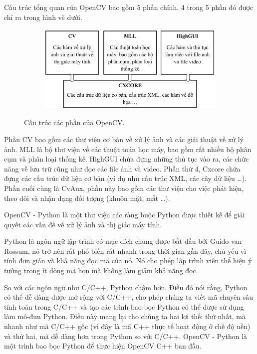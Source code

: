 Cấu trúc tổng quan của OpenCV bao gồm 5 phần chính. 4 trong 5 phần đó được chỉ ra
trong hình vẽ dưới.

\begin{figure}[t]
    \begin{subfigure}{0.7\textwidth}
        \includegraphics[width=0.99\linewidth]{Chapters/items/chap2_1.jpg}
        \caption{}
        \label{fig:chap2_1}
    \end{subfigure}
    \caption{Cấu trúc các phần của OpenCV.}
\end{figure}

Phần CV bao gồm các thư viện cơ bản về xử lý ảnh và các giải thuật về xử lý ảnh.
MLL là bộ thư viện về các thuật toán học máy, bao gồm rất nhiều bộ phân cụm và phân
loại thống kê. HighGUI chứa đựng những thủ tục vào ra, các chức năng về lưu trữ cũng
như đọc các file ảnh và video. Phần thứ 4, Cxcore chứa đựng các cấu trúc dữ liệu
cơ bản (ví dụ như cấu trúc XML, các cây dữ liệu …). Phần cuối cùng là CvAux, phần này
bao gồm các thư viện cho việc phát hiện, theo dõi và nhận dạng đối tượng (khuôn mặt, mắt …).

OpenCV - Python là một thư viện các ràng buộc Python được thiết kế để giải quyết các vấn đề
về xử lý ảnh và thị giác máy tính.

Python là ngôn ngữ lập trình có mục đích chung được bắt đầu bởi Guido van Rossum,
nó trở nên rất phổ biến rất nhanh trong thời gian gần đây, chủ yếu vì tính đơn giản
và khả năng đọc mã của nó. Nó cho phép lập trình viên thể hiện ý tưởng trong ít dòng
mã hơn mà không làm giảm khả năng đọc.

So với các ngôn ngữ như C/C++, Python chậm hơn. Điều đó nói rằng, Python có thể dễ dàng
được mở rộng với C/C++, cho phép chúng ta viết mã chuyên sâu tính toán trong C/C++
và tạo các trình bao bọc Python có thể được sử dụng làm mô-đun Python.
Điều này mang lại cho chúng ta hai lợi thế: thứ nhất, mã nhanh như mã C/C++ gốc
(vì đây là mã C++ thực tế hoạt động ở chế độ nền) và thứ hai, mã dễ dàng hơn trong
Python so với C/C++. OpenCV - Python là một trình bao bọc Python để thực hiện OpenCV C++
ban đầu.

